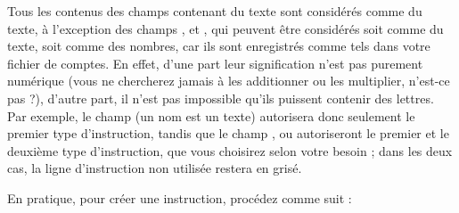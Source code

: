 Tous les contenus des champs contenant du texte sont considérés comme du texte, à l'exception des champs ,  et , qui peuvent être considérés soit comme du texte, soit comme des nombres, car ils sont enregistrés comme tels dans votre fichier de comptes. En effet, d'une part leur signification n'est pas purement numérique (vous ne chercherez jamais à les additionner ou les multiplier, n'est-ce pas ?), d'autre part, il n'est pas impossible qu'ils puissent contenir des lettres. Par exemple, le champ  (un nom est un texte) autorisera donc seulement le premier type d'instruction, tandis que le champ ,  ou  autoriseront le premier et le deuxième type d'instruction, que vous choisirez selon votre besoin ;  dans les deux cas, la ligne d'instruction non utilisée restera en grisé.

En pratique, pour créer une instruction, procédez comme suit :

